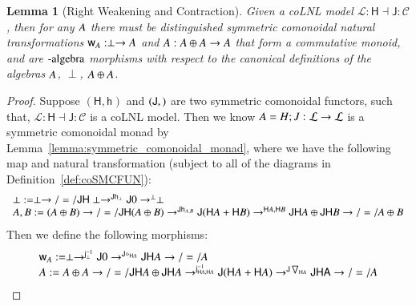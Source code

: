 \documentclass{lmcs}
\newtheorem{lemma}[theorem]{Lemma}
\let\mto\to
\let\to\relax
\newcommand{\to}{\rightarrow}
\let\r\relax
\let\c\relax
\let\j\relax
\let\wn\relax
\newcommand{\cat}[1]{\mathcal{#1}}
\newcommand{\func}[1]{\mathsf{#1}}
\newcommand{\h}[1]{\mathsf{h}_{#1}}
\newcommand{\r}[1]{\mathsf{r}_{#1}}
\newcommand{\w}[1]{\mathsf{w}_{#1}}
\newcommand{\c}[1]{\mathsf{c}_{#1}}
\newcommand{\j}[1]{\mathsf{j}_{#1}}
\newcommand{\jinv}[1]{\mathsf{j}^{-1}_{#1}}
\newcommand{\wn}[0]{\mathop{?}}
\newcommand{\codiag}[1]{\bigtriangledown_{#1}}
\begin{document}
\begin{lemma}[Right Weakening and Contraction]
  \label{lemma:right_weakening_and_contraction}
  Given a coLNL model $\cat{L} : \func{H} \dashv \func{J} : \cat{C}$,
  then for any $\wn A$ there must be distinguished symmetric
  comonoidal natural transformations $\w{A} : \perp \mto \wn A$ and
  $\c{A} : \wn A \oplus \wn A \mto \wn A$ that form a commutative
  monoid, and are $\wn\text{-algebra}$ morphisms with respect to the
  canonical definitions of the algebras $\wn A$, $\perp$, $\wn A
  \oplus \wn A$.
\end{lemma}
\begin{proof}
  Suppose $(\func{H},\h{})$ and $(\func{J},\j{})$ are two symmetric
  comonoidal functors, such that, $\cat{L} : \func{H} \dashv \func{J} :
  \cat{C}$ is a coLNL model.  Then we know $\wn A = H;J : \cat{L} \mto
  \cat{L}$ is a symmetric comonoidal monad by
  Lemma~\ref{lemma:symmetric_comonoidal_monad}, where we have the
  following map and natural transformation (subject to all of the
  diagrams in Definition~\ref{def:coSMCFUN}):
  \[
  \begin{array}{lll}
    \r{\perp} := \wn \perp \mto/=/ \func{JH}\perp \mto^{\func{J}\h{\perp}} \func{J}0 \mto^{\j{\perp}} \perp\\
    \r{A,B} := \wn (A \oplus B) \mto/=/ \func{JH}(A \oplus B) \mto^{\func{J}\h{A,B}} \func{J}(\func{H}A + \func{H}B) \mto^{\j{\func{H}A,\func{H}B}} \func{JH}A \oplus \func{JH}B \mto/=/ \wn A \oplus \wn B\\
  \end{array}
  \]
  Then we define the following morphisms:
  \[
  \begin{array}{lll}
    \w{A} := \perp \mto^{\jinv{\perp}} \func{J} 0 \mto^{\func{J}\diamond_{\func{H} A}} \func{JH}A \mto/=/ \wn A\\
    \c{A} := \wn A \oplus \wn A \mto/=/ \func{JH}A \oplus \func{JH}A \mto^{\jinv{\func{H}A,\func{H}A}} \func{J}(\func{H}A + \func{H}A) \mto^{\func{J}\codiag{\func{H}A}} \func{JHA} \mto/=/ \wn A
  \end{array}
  \]
  

\end{proof}
\end{document}
